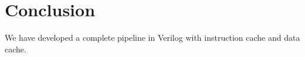 \section{Conclusion}
We have developed a complete pipeline in Verilog with instruction cache and data cache.
